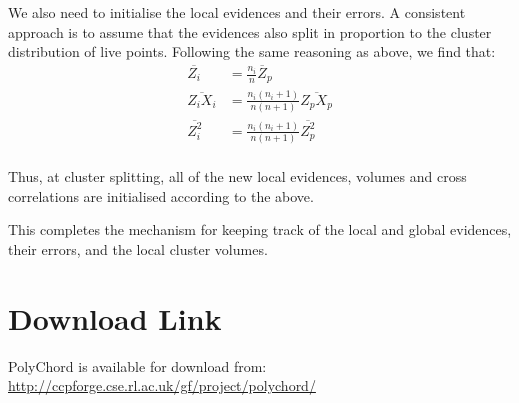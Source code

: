 We also need to initialise the local evidences and their errors. A consistent approach is to assume that the evidences also split in proportion to the cluster distribution of live points. Following the same reasoning as above, we find that:
\begin{align}
  \overline{Z_i}&=  \frac{n_i}{n} \overline Z_p \\
  \overline{Z_i X_i}&= \frac{n_i(n_i+1)}{n(n+1)} \overline{Z_p X_p} \\
  \overline{Z_i^2}  &= \frac{n_i(n_i+1)}{n(n+1)} \overline{Z_p^2} \\
\end{align}

Thus, at cluster splitting, all of the new local evidences, volumes and cross correlations are initialised according to the above.

This completes the mechanism for keeping track of the local and global evidences, their errors, and the local cluster volumes.

\section*{Download Link}
PolyChord is available for download from:\\ \url{http://ccpforge.cse.rl.ac.uk/gf/project/polychord/}

